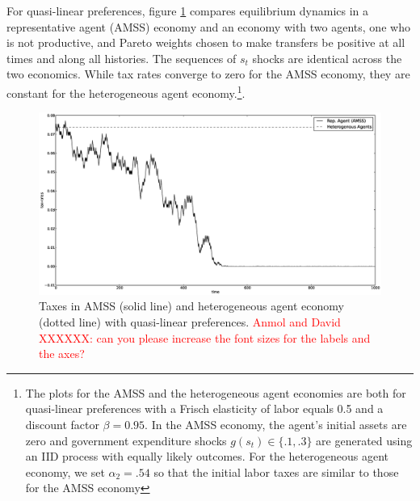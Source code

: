 \documentclass[thmsb,11pt]{article}
\begin{document}
For quasi-linear preferences, figure \ref{fig: AMSS vs BEGS} compares equilibrium dynamics in a
representative agent (AMSS) economy and an economy with two agents, one who
is not productive, and  Pareto weights chosen to make
transfers be positive at all times  and along all  histories. The sequences of $s_t$ shocks are identical across the two economics.
 While tax rates converge to zero for the AMSS economy, they are constant for the heterogeneous agent economy.\footnote{The plots for the AMSS and the heterogeneous agent economies are both  for quasi-linear preferences with a Frisch elasticity of labor equals 0.5 and a discount factor $\beta=0.95$. In the AMSS economy,  the agent's  initial assets are zero  and  government expenditure shocks $g(s_t) \in\{.1,.3\}$ are generated using an IID process with equally likely outcomes.  For the heterogeneous agent economy, we set  $\alpha_2=.54$ so that the initial labor taxes are similar to those for the AMSS economy}. %



  \begin{figure}[htp]
 \centering
 \includegraphics[width=\textwidth]{Draft25Graphs/BEGS_AMSS.eps}
 \caption{Taxes in AMSS (solid line) and heterogeneous agent economy (dotted line) with quasi-linear preferences. \textcolor{red}{Anmol and David XXXXXX: can you please increase the font sizes for the labels and the axes?}}
 \label{fig: AMSS vs BEGS}
 \end{figure}
\end{document}
